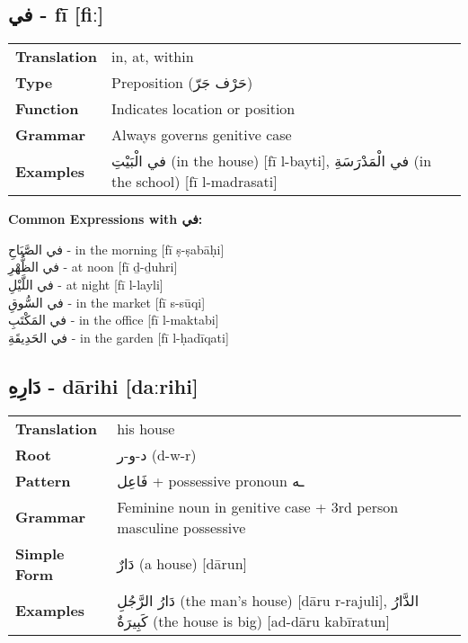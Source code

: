 \documentclass[a4paper,12pt]{article}
\begin{document}
\subsection{\textarabic{في} - \textbf{fī} [fiː]}

\begin{tabular}{p{3cm}p{10cm}}
\toprule
\textbf{Translation} & in, at, within \\
\textbf{Type} & Preposition (\textarabic{حَرْف جَرّ}) \\
\textbf{Function} & Indicates location or position \\
\textbf{Grammar} & Always governs genitive case \\
\textbf{Examples} & \textarabic{في الْبَيْتِ} (in the house) [fī l-bayti], \textarabic{في الْمَدْرَسَةِ} (in the school) [fī l-madrasati] \\
\bottomrule
\end{tabular}

\textbf{Common Expressions with \textarabic{في}:}
\begin{multicols}{2}
\small
\textarabic{في الصَّبَاحِ} - in the morning [fī ṣ-ṣabāḥi]\\
\textarabic{في الظُّهْرِ} - at noon [fī ḏ-ḏuhri]\\
\textarabic{في اللَّيْلِ} - at night [fī l-layli]\\
\textarabic{في السُّوقِ} - in the market [fī s-sūqi]\\
\textarabic{في المَكْتَبِ} - in the office [fī l-maktabi]\\
\textarabic{في الحَدِيقَةِ} - in the garden [fī l-ḥadīqati]
\end{multicols}

\subsection{\textarabic{دَارِهِ} - \textbf{dārihi} [daːrihi]}

\begin{tabular}{p{3cm}p{10cm}}
\toprule
\textbf{Translation} & his house \\
\textbf{Root} & \textarabic{د-و-ر} (d-w-r) \\
\textbf{Pattern} & \textarabic{فَاعِل} + possessive pronoun \textarabic{ـه} \\
\textbf{Grammar} & Feminine noun in genitive case + 3rd person masculine possessive \\
\textbf{Simple Form} & \textarabic{دَارٌ} (a house) [dārun] \\
\textbf{Examples} & \textarabic{دَارُ الرَّجُلِ} (the man's house) [dāru r-rajuli], \textarabic{الدَّارُ كَبِيرَةٌ} (the house is big) [ad-dāru kabīratun] \\
\bottomrule
\end{tabular}
\end{document}
